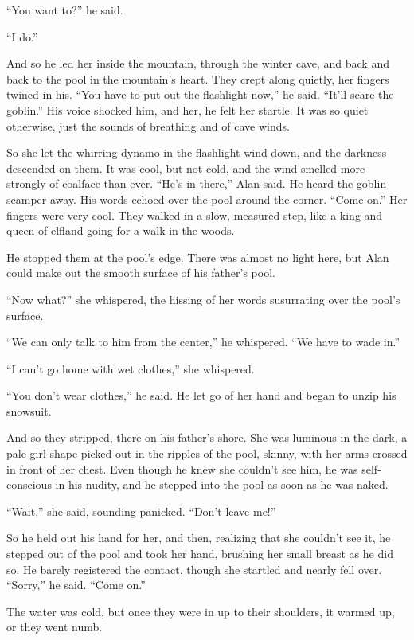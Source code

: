 \documentclass{article}
\begin{document}
``You want to?'' he said.

``I do.''

And so he led her inside the mountain, through the winter cave, and
back and back to the pool in the mountain's heart.  They crept along
quietly, her fingers twined in his.  ``You have to put out the
flashlight now,'' he said.  ``It'll scare the goblin.'' His voice
shocked him, and her, he felt her startle.  It was so quiet otherwise,
just the sounds of breathing and of cave winds.

So she let the whirring dynamo in the flashlight wind down, and the
darkness descended on them.  It was cool, but not cold, and the wind
smelled more strongly of coalface than ever.  ``He's in there,'' Alan
said.  He heard the goblin scamper away.  His words echoed over the
pool around the corner.  ``Come on.'' Her fingers were very cool. 
They walked in a slow, measured step, like a king and queen of elfland
going for a walk in the woods.

He stopped them at the pool's edge.  There was almost no light here,
but Alan could make out the smooth surface of his father's pool.

``Now what?'' she whispered, the hissing of her words susurrating over
the pool's surface.

``We can only talk to him from the center,'' he whispered.  ``We have
to wade in.''

``I can't go home with wet clothes,'' she whispered.

``You don't wear clothes,'' he said.  He let go of her hand and began
to unzip his snowsuit.

And so they stripped, there on his father's shore.  She was luminous
in the dark, a pale girl-shape picked out in the ripples of the pool,
skinny, with her arms crossed in front of her chest.  Even though he
knew she couldn't see him, he was self-conscious in his nudity, and he
stepped into the pool as soon as he was naked.

``Wait,'' she said, sounding panicked.  ``Don't leave me!''

So he held out his hand for her, and then, realizing that she couldn't
see it, he stepped out of the pool and took her hand, brushing her
small breast as he did so.  He barely registered the contact, though
she startled and nearly fell over.  ``Sorry,'' he said.  ``Come on.''

The water was cold, but once they were in up to their shoulders, it
warmed up, or they went numb.
\end{document}

